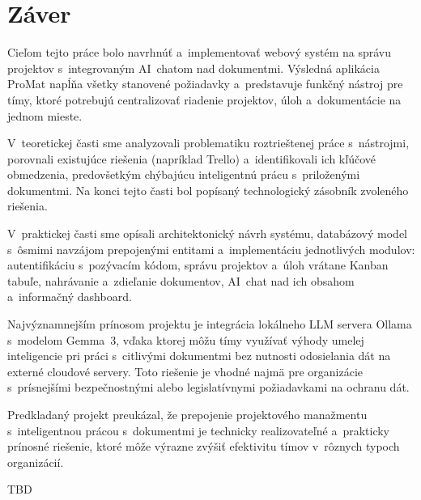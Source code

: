 \chapter*{Záver}

        Cieľom tejto práce bolo navrhnúť a~implementovať webový systém na správu
projektov s~integrovaným AI~chatom nad dokumentmi. Výsledná aplikácia ProMat napĺňa
všetky stanovené požiadavky a~predstavuje funkčný nástroj pre tímy, ktoré potrebujú
centralizovať riadenie projektov, úloh a~dokumentácie na jednom mieste.

        V~teoretickej časti sme analyzovali problematiku roztrieštenej práce s~nástrojmi,
porovnali existujúce riešenia (napríklad Trello) a~identifikovali ich kľúčové
obmedzenia, predovšetkým chýbajúcu inteligentnú prácu s~priloženými dokumentmi.
Na konci tejto časti bol popísaný technologický zásobník zvoleného riešenia.

        V~praktickej časti sme opísali architektonický návrh systému, databázový model
s~ôsmimi navzájom prepojenými entitami a~implementáciu jednotlivých modulov:
autentifikáciu s~pozývacím kódom, správu projektov a~úloh vrátane Kanban tabuľe,
nahrávanie a~zdieľanie dokumentov, AI~chat nad ich obsahom a~informačný dashboard.

        Najvýznamnejším prínosom projektu je integrácia lokálneho LLM servera Ollama
s~modelom Gemma~3, vďaka ktorej môžu tímy využívať výhody umelej inteligencie pri
práci s~citlivými dokumentmi bez nutnosti odosielania dát na externé cloudové servery.
Toto riešenie je vhodné najmä pre organizácie s~prísnejšími bezpečnostnými alebo
legislatívnymi požiadavkami na ochranu dát.

        Predkladaný projekt preukázal, že prepojenie projektového manažmentu
s~inteligentnou prácou s~dokumentmi je technicky realizovateľné a~prakticky
prínosné riešenie, ktoré môže výrazne zvýšiť efektivitu tímov v~rôznych typoch
organizácií.


TBD